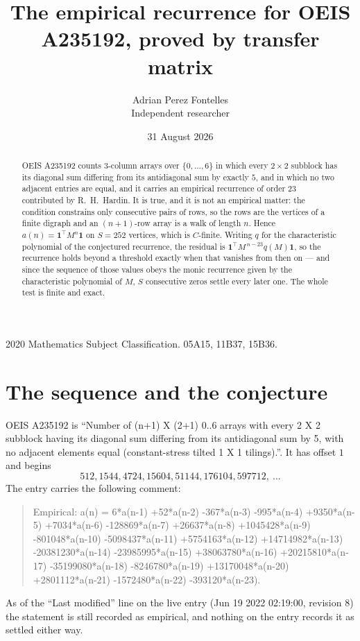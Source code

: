 \documentclass[11pt,a4paper]{article}
\title{The empirical recurrence for OEIS A235192, proved by transfer matrix}
\author{Adrian Perez Fontelles\\ \small Independent researcher}
\date{31 August 2026}
\theoremstyle{plain}
\theoremstyle{definition}
\begin{document}
\maketitle

\begin{abstract}
OEIS A235192 counts $3$-column arrays over $\{0,\dots,6\}$ in which every
$2\times2$ subblock has its diagonal sum differing from its antidiagonal sum by
exactly $5$, and in which no two adjacent entries are equal, and it
carries an empirical recurrence of order $23$ contributed by R.~H.~Hardin. It is true,
and it is not an empirical matter: the condition constrains only consecutive pairs of rows,
so the rows are the vertices of a finite digraph and an $(n+1)$-row array is a walk of
length $n$. Hence $a(n)=\mathbf{1}^{\!\top}M^{n}\mathbf{1}$ on $S=252$ vertices, which
is $C$-finite. Writing $q$ for the characteristic polynomial of the conjectured recurrence,
the residual is $\mathbf{1}^{\!\top}M^{\,n-23}q(M)\mathbf{1}$, so the recurrence
holds beyond a threshold exactly when that vanishes from then on --- and since the sequence
of those values obeys the monic recurrence given by the characteristic polynomial of $M$,
$S$ consecutive zeros settle every later one. The whole test is finite and exact.
\end{abstract}

\noindent\small 2020 Mathematics Subject Classification. 05A15, 11B37, 15B36.\normalsize

\section{The sequence and the conjecture}

OEIS A235192 is ``Number of (n+1) X (2+1) 0..6 arrays with every 2 X 2 subblock having its diagonal sum differing from its antidiagonal sum by 5, with no adjacent elements equal (constant-stress tilted 1 X 1 tilings).''. It has offset
$1$ and begins
\[
512, 1544, 4724, 15604, 51144, 176104, 597712,\ \dots
\]
The entry carries the following comment:
\begin{quote}\small
Empirical: a(n) = 6*a(n-1) +52*a(n-2) -367*a(n-3) -995*a(n-4) +9350*a(n-5) +7034*a(n-6) -128869*a(n-7) +26637*a(n-8) +1045428*a(n-9) -801048*a(n-10) -5098437*a(n-11) +5754163*a(n-12) +14714982*a(n-13) -20381230*a(n-14) -23985995*a(n-15) +38063780*a(n-16) +20215810*a(n-17) -35199080*a(n-18) -8246780*a(n-19) +13170048*a(n-20) +2801112*a(n-21) -1572480*a(n-22) -393120*a(n-23).
\end{quote}
As of the ``Last modified'' line on the live entry (Jun 19 2022 02:19:00, revision 8) the statement is
still recorded as empirical, and nothing on the entry records it as settled either way.
\end{document}
